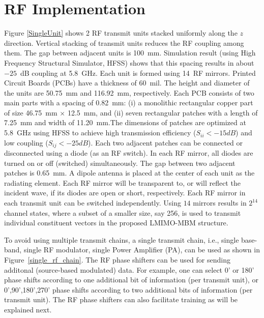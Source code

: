 \section{RF Implementation}
\label{RF Implementation}
Figure \ref{SingleUnit} shows 2 RF transmit units stacked uniformly along the $z$ direction. Vertical stacking of transmit units reduces the RF coupling among them. The gap between adjacent units is 100~mm. Simulation result (using High Frequency Structural Simulator, HFSS) shows that this spacing results in about $-25$~dB coupling at 5.8~GHz. Each unit is formed using 14~RF mirrors. Printed Circuit Boards (PCBs) have a thickness of 60~mil. The height and diameter of the units are 50.75~mm and 116.92~mm, respectively.
Each PCB consists of two main parts with a spacing of 0.82~mm: (i) a monolithic rectangular copper part of size 46.75~mm $\times$ 12.5~mm, and (ii) seven rectangular patches with a length of 7.25~mm and width of 11.20~mm.The dimensions of patches are optimized at 5.8~GHz using HFSS to achieve high transmission efficiency ($S_{ii}<-15dB$) and low coupling ($S_{ij}<-25dB$).
Each two adjacent patches can be connected or disconnected using a diode (as an RF switch). In each RF mirror, all diodes are turned on or off (switched) simultaneously. The gap between two adjacent patches is 0.65~mm. A dipole antenna is placed at the center of each unit as the radiating element. Each RF mirror will be transparent to, or will reflect the incident wave, if its diodes are open or short, respectively. Each RF mirror in each transmit unit can be switched independently. Using $14$ mirrors results in $2^{14}$ channel states, where a subset of a smaller size, say 256, is used to transmit individual constituent vectors in the proposed LMIMO-MBM structure.

To avoid using multiple transmit chains, a single transmit chain, i.e., single base-band, single RF modulator, single Power Amplifier (PA), can be used as shown in Figure~\ref{single_rf_chain}. The RF phase shifters can be used for sending additonal (source-based modulated) data. For example, one can select 0' or 180' phase shifts according to one additional bit of information (per transmit unit), or  0',90',180',270' phase shifts according to two additional bits of information (per transmit unit). The RF phase shifters can also facilitate training as will be explained next.

